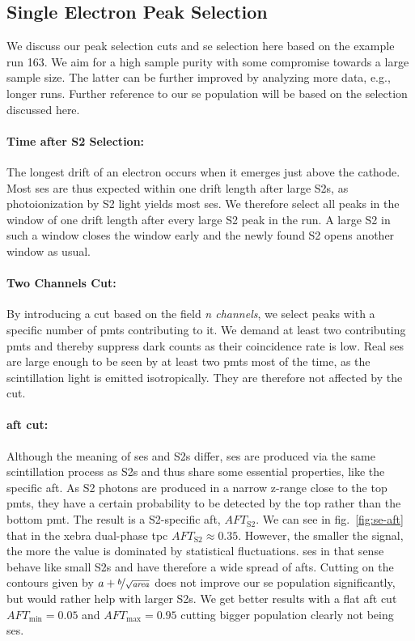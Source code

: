 
\FloatBarrier
\subsection{Single Electron Peak Selection}
\label{ssec:tagging}
\FloatBarrier


We discuss our peak selection cuts and \gls{se} selection here based on the example run 163.
We aim for a high sample purity with some compromise towards a large sample size.
The latter can be further improved by analyzing more data, e.g., longer runs.
Further reference to our \gls{se} population will be based on the selection discussed here.

\paragraph{Time after S2 Selection:} The longest drift of an electron occurs when it emerges just above the cathode.
Most \glspl{se} are thus expected within one drift length after large S2s, as photoionization by S2 light yields most \glspl{se}.
We therefore select all peaks in the window of one drift length after every large S2 peak in the run.
A large S2 in such a window closes the window early and the newly found S2 opens another window as usual.

\paragraph{Two Channels Cut:} By introducing a cut based on the field \emph{n channels}, we select peaks with a specific number of \glspl{pmt} contributing to it.
We demand at least two contributing \glspl{pmt} and thereby suppress dark counts as their coincidence rate is low.
Real \glspl{se} are large enough to be seen by at least two \glspl{pmt} most of the time, as the scintillation light is emitted isotropically.
They are therefore not affected by the cut.

\paragraph{\gls{aft} cut:} Although the meaning of \glspl{se} and S2s differ, \glspl{se} are produced via the same scintillation process as S2s and thus share some essential properties, like the specific \gls{aft}.
As S2 photons are produced in a narrow z-range close to the top \glspl{pmt}, they have a certain probability to be detected by the top rather than the bottom \gls{pmt}.
The result is a S2-specific \gls{aft}, $ \mathit{AFT}_\mathrm{S2} $.
We can see in fig.~\ref{fig:se-aft} that in the \gls{xebra} dual-phase \gls{tpc} $ \mathit{AFT}_\mathrm{S2} \approx 0.35 $.
However, the smaller the signal, the more the value is dominated by statistical fluctuations.
\glspl{se} in that sense behave like small S2s and have therefore a wide spread of \glspl{aft}.
Cutting on the contours given by $ a + \nicefrac{b}{\sqrt{\mathit{area}}} $ does not improve our \gls{se} population significantly, but would rather help with larger S2s.
We get better results with a flat \gls{aft} cut $ \mathit{AFT}_\mathrm{min} = 0.05 $ and $ \mathit{AFT}_\mathrm{max} = 0.95 $ cutting bigger population clearly not being \glspl{se}.


